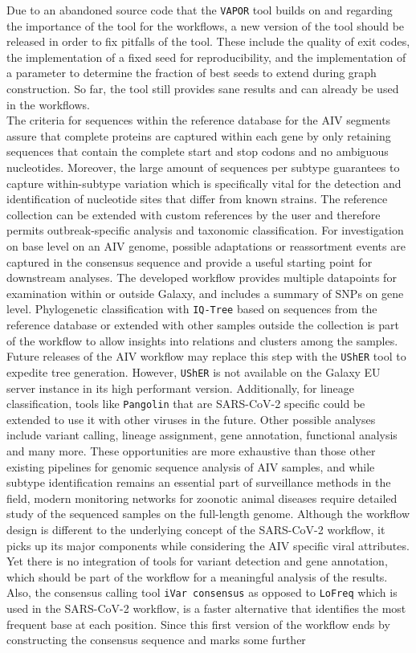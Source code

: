 Due to an abandoned source code that the \texttt{VAPOR} tool builds on and regarding the importance of the tool for the workflows, a new version of the tool should be released in order to fix pitfalls of the tool. These include the quality of exit codes, the implementation of a fixed seed for reproducibility, and the implementation of a parameter to determine the fraction of best seeds to extend during graph construction. So far, the tool still provides sane results and can already be used in the workflows.\\
The criteria for sequences within the reference database for the \ac{AIV} segments assure that complete proteins are captured within each gene by only retaining sequences that contain the complete start and stop codons and no ambiguous nucleotides. Moreover, the large amount of sequences per subtype guarantees to capture within-subtype variation which is specifically vital for the detection and identification of nucleotide sites that differ from known strains. The reference collection can be extended with custom references by the user and therefore permits outbreak-specific analysis and taxonomic classification. For investigation on base level on an \ac{AIV} genome, possible adaptations or reassortment events are captured in the consensus sequence and provide a useful starting point for downstream analyses. The developed workflow provides multiple datapoints for examination within or outside Galaxy, and includes a summary of \acp{SNP} on gene level. Phylogenetic classification with \texttt{IQ-Tree} based on sequences from the reference database or extended with other samples outside the collection is part of the workflow to allow insights into relations and clusters among the samples. Future releases of the \ac{AIV} workflow may replace this step with the \texttt{UShER} tool to expedite tree generation. However, \texttt{UShER} is not available on the Galaxy EU server instance in its high performant version. Additionally, for lineage classification, tools like \texttt{Pangolin} that are \ac{SARS-CoV-2} specific could be extended to use it with other viruses in the future. Other possible analyses include variant calling, lineage assignment, gene annotation, functional analysis and many more. These opportunities are more exhaustive than those other existing pipelines for genomic sequence analysis of \ac{AIV} samples, and while subtype identification remains an essential part of surveillance methods in the field, modern monitoring networks for zoonotic animal diseases require detailed study of the sequenced samples on the full-length genome. Although the workflow design is different to the underlying concept of the \ac{SARS-CoV-2} workflow, it picks up its major components while considering the \ac{AIV} specific viral attributes. Yet there is no integration of tools for variant detection and gene annotation, which should be part of the workflow for a meaningful analysis of the results. Also, the consensus calling tool \texttt{iVar consensus} as opposed to \texttt{LoFreq} which is used in the \ac{SARS-CoV-2} workflow, is a faster alternative that identifies the most frequent base at each position. Since this first version of the workflow ends by constructing the consensus sequence and marks some further 
